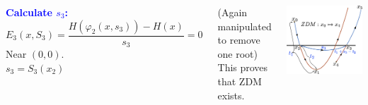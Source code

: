 \documentclass[xcolor=x11names,compress]{beamer}
\renewcommand{\(}{\begin{columns}}
\renewcommand{\)}{\end{columns}}
\newcommand{\<}[1]{\begin{column}{#1}}
\renewcommand{\>}{\end{column}}
\newcommand{\hlb}[1]{\textbf{\textcolor{blue}{#1}}}
\begin{document}
\begin{frame}
\begin{columns}[c]
\hlb{ Calculate $s_3$:}\\
\[
E_3(x,S_3)=\frac{H(\varphi_2(x,s_3))-H(x)}{s_3}=0
\]
Near $(0,0)$.  \\

$s_3=S_3(x_2)$


\vspace{1em}
(Again manipulated to remove one root)\\

\vspace{1em}
This proves that ZDM exists.  
\begin{center}
\includegraphics[width=\textwidth]{ZDM}
\end{center}

\end{columns}
\end{frame}
\end{document}
